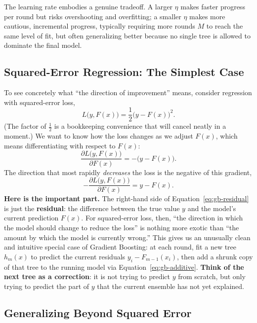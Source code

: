 \documentclass[12pt,a4paper]{article}
\begin{document}
The learning rate embodies a genuine tradeoff. A larger $\eta$ makes faster progress per round but risks overshooting and overfitting; a smaller $\eta$ makes more cautious, incremental progress, typically requiring more rounds $M$ to reach the same level of fit, but often generalizing better because no single tree is allowed to dominate the final model.

\subsection{Squared-Error Regression: The Simplest Case}

To see concretely what ``the direction of improvement'' means, consider regression with squared-error loss,
\begin{equation}
\label{eq:squared-loss}
L\big(y, F(x)\big) = \frac{1}{2}\big(y - F(x)\big)^2.
\end{equation}
(The factor of $\frac12$ is a bookkeeping convenience that will cancel neatly in a moment.) We want to know how the loss changes as we adjust $F(x)$, which means differentiating with respect to $F(x)$:
$$
\frac{\partial L\big(y, F(x)\big)}{\partial F(x)} = -\big(y - F(x)\big).
$$
The direction that most rapidly \emph{decreases} the loss is the negative of this gradient,
\begin{equation}
\label{eq:gb-residual}
-\frac{\partial L\big(y, F(x)\big)}{\partial F(x)} = y - F(x).
\end{equation}
\textbf{Here is the important part.} The right-hand side of Equation~\eqref{eq:gb-residual} is just the \textbf{residual}: the difference between the true value $y$ and the model's current prediction $F(x)$. For squared-error loss, then, ``the direction in which the model should change to reduce the loss'' is nothing more exotic than ``the amount by which the model is currently wrong.'' This gives us an unusually clean and intuitive special case of Gradient Boosting: at each round, fit a new tree $h_m(x)$ to predict the current residuals $y_i - F_{m-1}(x_i)$, then add a shrunk copy of that tree to the running model via Equation~\eqref{eq:gb-additive}. \textbf{Think of the next tree as a correction}: it is not trying to predict $y$ from scratch, but only trying to predict the part of $y$ that the current ensemble has not yet explained.

\subsection{Generalizing Beyond Squared Error}
\end{document}
